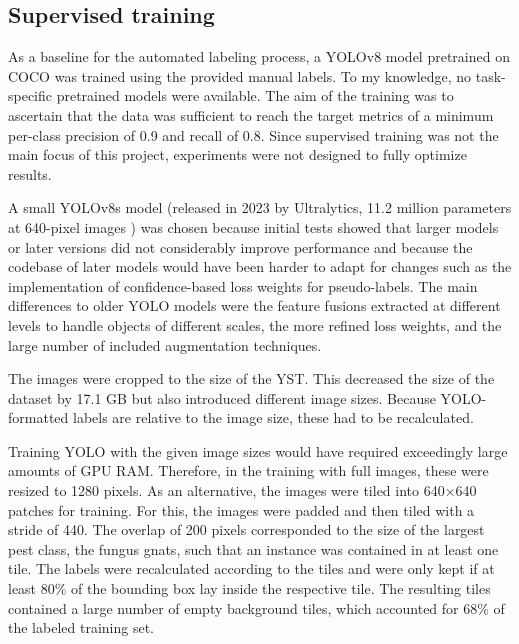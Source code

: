 \documentclass[12pt, a4paper]{article}
\begin{document}
\subsection{Supervised training}
\label{sec:supervised_methods}

As a baseline for the automated labeling process, a YOLOv8 model pretrained on COCO was trained using the provided manual labels. To my knowledge, no task-specific pretrained models were available. The aim of the training was to ascertain that the data was sufficient to reach the target metrics of a minimum per-class precision of 0.9 and recall of 0.8. Since supervised training was not the main focus of this project, experiments were not designed to fully optimize results.

A small YOLOv8s model (released in 2023 by Ultralytics, 11.2 million parameters at 640-pixel images \cite{YOLO8}) was chosen because initial tests showed that larger models or later versions did not considerably improve performance and because the codebase of later models would have been harder to adapt for changes such as the implementation of confidence-based loss weights for pseudo-labels. The main differences to older YOLO models were the feature fusions extracted at different levels to handle objects of different scales, the more refined loss weights, and the large number of included augmentation techniques.

The images were cropped to the size of the YST. This decreased the size of the dataset by 17.1 GB but also introduced different image sizes. Because YOLO-formatted labels are relative to the image size, these had to be recalculated.

Training YOLO with the given image sizes would have required exceedingly large amounts of GPU RAM. Therefore, in the training with full images, these were resized to 1280 pixels. As an alternative, the images were tiled into 640×640 patches for training. For this, the images were padded and then tiled with a stride of 440. The overlap of 200 pixels corresponded to the size of the largest pest class, the fungus gnats, such that an instance was contained in at least one tile. The labels were recalculated according to the tiles and were only kept if at least 80\% of the bounding box lay inside the respective tile. The resulting tiles contained a large number of empty background tiles, which accounted for 68\% of the labeled training set.
\end{document}
